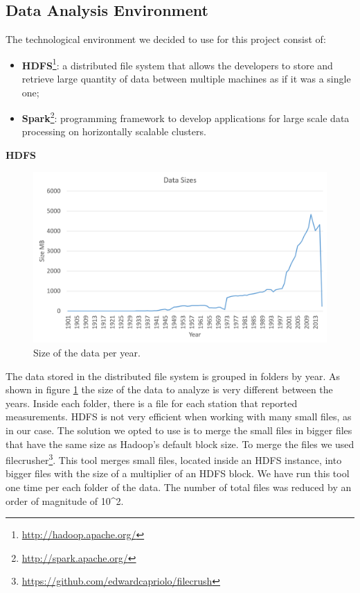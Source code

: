 \documentclass{vldb}
\begin{document}
\subsection{Data Analysis Environment}
The technological environment we decided to use for this project consist of:
\begin{itemize}
    \item \textbf{HDFS}\footnote{\href{Hadoop Distributed File System}{http://hadoop.apache.org/}}: a distributed file system that allows the developers to store and retrieve large quantity of data between multiple machines as if it was a single one;
    \item \textbf{Spark}\footnote{\href{Apache Spark}{http://spark.apache.org/}}: programming framework to develop applications for large scale data processing on horizontally scalable clusters.
\end{itemize}

\textbf{HDFS}

\begin{figure}[tbh]
\includegraphics[width=1\linewidth]{dataSize}
\caption{Size of the data per year.}
\label{fig:dataSize}
\end{figure}

The data stored in the distributed file system is grouped in folders by year. As shown in figure \ref{fig:dataSize} the size of the data to analyze is very different between the years. Inside each folder, there is a file for each station that reported measurements. HDFS is not very efficient when working with many small files\cite{zhang2012improving}, as in our case. The solution we opted to use is to merge the small files in bigger files that have the same size as Hadoop's default block size. To merge the files we used filecrusher\footnote{\href{Hadoop Filecrusher}{https://github.com/edwardcapriolo/filecrush}}. This tool merges small files, located inside an HDFS instance, into bigger files with the size of a multiplier of an HDFS block. We have run this tool one time per each folder of the data. The number of total files was reduced by an order of magnitude of {10^2}.\\
\end{document}

